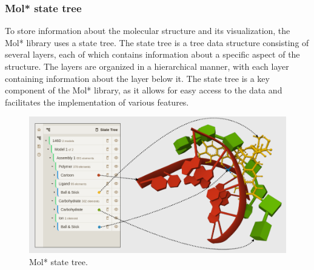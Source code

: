 \documentclass[
  digital,     %
  oneside,     %
  nosansbold,  %
  nocolorbold, %
  lof,         %
  lot,         %
]{fithesis4}
\begin{document}
\subsubsection{Mol* state tree}

To store information about the molecular structure and its visualization, the Mol* library uses a state tree. The state tree is a tree data structure consisting of several layers, each of which contains information about a specific aspect of the structure. The layers are organized in a hierarchical manner, with each layer containing information about the layer below it. The state tree is a key component of the Mol* library, as it allows for easy access to the data and facilitates the implementation of various features. \cite{sehnal2021molstar}


\begin{figure}[htbp]
  \begin{center}
    \includegraphics[width=\textwidth]{figures/state_tree.png}
  \end{center}
  \caption{Mol* state tree.}
  \label{fig:state_tree}
\end{figure}
\end{document}

